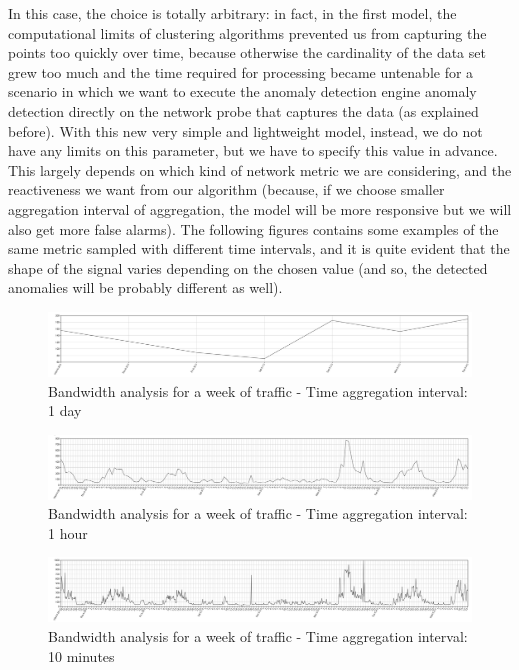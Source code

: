 \documentclass[12pt,a4paper,cucitura]{toptesi}
\begin{document}
In this case, the choice is totally arbitrary: in fact, in the first model, the computational limits of clustering algorithms prevented us from capturing the points too quickly over time, because otherwise the cardinality of the data set grew too much and the time required for processing became untenable for a scenario in which we want to execute the anomaly detection engine anomaly detection directly on the network probe that captures the data (as explained before). With this new very simple and lightweight model, instead, we do not have any limits on this parameter, but we have to specify this value in advance. This largely depends on which kind of network metric we are considering, and the reactiveness we want from our algorithm (because, if we choose smaller aggregation interval of aggregation, the model will be more responsive but we will also get more false alarms).
The following figures contains some examples of the same metric sampled with different time intervals, and it is quite evident that the shape of the signal varies depending on the chosen value (and so, the detected anomalies will be probably different as well).

\begin{figure}
\centering
\includegraphics[width=\textwidth]{bw1day.png}
\caption{Bandwidth analysis for a week of traffic - Time aggregation interval: 1 day}
\end{figure}

\begin{figure}
\centering
\includegraphics[width=\textwidth]{bw1hour.png}
\caption{Bandwidth analysis for a week of traffic - Time aggregation interval: 1 hour}
\end{figure}

\begin{figure}
\centering
\includegraphics[width=\textwidth]{bw10min.png}
\caption{Bandwidth analysis for a week of traffic - Time aggregation interval: 10 minutes}
\end{figure}
\end{document}
